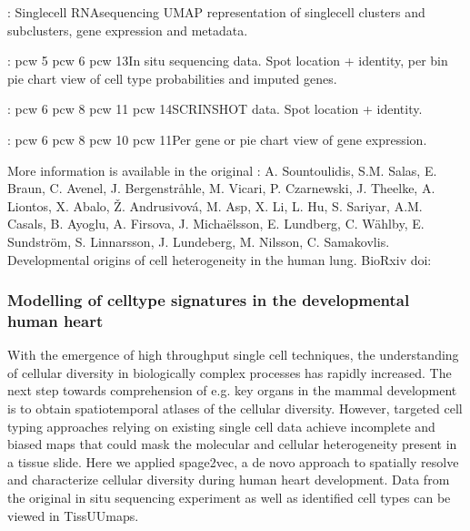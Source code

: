 \documentclass[letterpaper,10pt,english,openany,oneside]{sphinxmanual}
\begin{document}
\sphinxAtStartPar
{}: Single\sphinxhyphen{}cell RNA\sphinxhyphen{}sequencing UMAP representation of single\sphinxhyphen{}cell clusters and sub\sphinxhyphen{}clusters, gene expression and metadata.

\sphinxAtStartPar
{}: pcw 5  pcw 6  pcw 13In situ sequencing data. Spot location + identity, per bin pie chart view of cell type probabilities and imputed genes.

\sphinxAtStartPar
{}: pcw 6  pcw 8  pcw 11  pcw 14SCRINSHOT data. Spot location + identity.

\sphinxAtStartPar
{}: pcw 6  pcw 8  pcw 10  pcw 11Per gene or pie chart view of gene expression.

\sphinxAtStartPar
More information is available in the original : A. Sountoulidis, S.M. Salas, E. Braun, C. Avenel, J. Bergenstråhle, M. Vicari, P. Czarnewski, J. Theelke, A. Liontos, X. Abalo, Ž. Andrusivová, M. Asp, X. Li, L. Hu, S. Sariyar, A.M. Casals, B. Ayoglu, A. Firsova, J. Michaëlsson, E. Lundberg, C. Wählby, E. Sundström, S. Linnarsson, J. Lundeberg, M. Nilsson, C. Samakovlis. Developmental origins of cell heterogeneity in the human lung. BioRxiv doi: 


\subsubsection{Modelling of cell\sphinxhyphen{}type signatures in the developmental human heart}
\label{\detokenize{docs/starting/projects:modelling-of-cell-type-signatures-in-the-developmental-human-heart}}
\sphinxAtStartPar
With the emergence of high throughput single cell techniques, the understanding of cellular diversity in biologically complex processes has rapidly increased. The next step towards comprehension of e.g. key organs in the mammal development is to obtain spatiotemporal atlases of the cellular diversity. However, targeted cell typing approaches relying on existing single cell data achieve incomplete and biased maps that could mask the molecular and cellular heterogeneity present in a tissue slide. Here we applied spage2vec, a de novo approach to spatially resolve and characterize cellular diversity during human heart development. Data from the original in situ sequencing experiment as well as identified cell types can be viewed in TissUUmaps.
\end{document}
